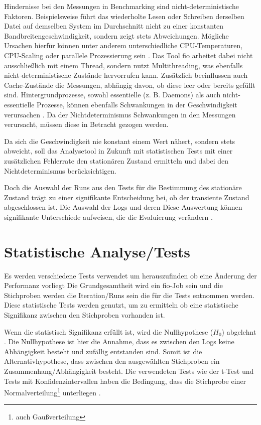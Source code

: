 Hindernisse bei den Messungen in Benchmarking sind nicht-deterministische Faktoren.
Beispielsweise führt das wiederholte Lesen oder Schreiben derselben Datei auf demselben System im Durchschnitt nicht zu einer konstanten Bandbreitengeschwindigkeit, 
sondern zeigt stets Abweichungen. 
Mögliche Ursachen hierfür können unter anderem unterschiedliche CPU-Temperaturen, CPU-Scaling oder parallele Prozessierung sein \cite{statistically_rigorous}. 
Das Tool fio arbeitet dabei nicht ausschließlich mit einem Thread, sondern nutzt Multithreading, was ebenfalls nicht-deterministische Zustände hervorrufen kann. 
Zusätzlich beeinflussen auch Cache-Zustände die Messungen, abhängig davon, ob diese leer oder bereits gefüllt sind. Hintergrundprozesse, 
sowohl essentielle (z. B. Daemons) als auch nicht-essentielle Prozesse, 
können ebenfalls Schwankungen in der Geschwindigkeit verursachen \cite{nine-year-of-bench}.
Da der Nichtdeterminismus Schwankungen in den Messungen verursacht, müssen diese in Betracht gezogen werden.

Da sich die Geschwindigkeit nie konstant einem Wert nähert, sondern stets
abweicht, soll das Analysetool in Zukunft mit statistischen Tests mit einer zusätzlichen Fehlerrate den stationären
Zustand ermitteln und dabei den Nichtdeterminismus berücksichtigen.

Doch die Auswahl der Runs aus den Tests für die Bestimmung des stationäre Zustand trägt zu einer signifikante Entscheidung bei,
 ob der transiente Zustand abgeschlossen ist.
Die Auswahl der Logs und deren Diese Auswertung können signifikante Unterschiede aufweisen, die die Evaluierung
verändern \cite{when_stop_tests}.



\section{Statistische Analyse/Tests}
Es werden verschiedene Tests verwendet um herauszufinden ob eine Änderung der Performanz vorliegt \cite{statistically_rigorous}
Die Grundgesamtheit wird ein fio-Job sein und die Stichproben werden die Iteration/Runs sein die für die Tests entnommen werden.
Diese statistische Tests werden genutzt, um zu ermitteln ob eine statistische Signifikanz zwischen den Stichproben vorhanden ist.

Wenn die statistisch Signifikanz erfüllt ist, wird die Nullhypothese ($H_0$) abgelehnt \cite{inferenzstatistik}.
Die Nullhypothese ist hier die Annahme, dass es zwischen den Logs keine Abhängigkeit besteht und zufällig entstanden sind.
Somit ist die Alternativhypothese, dass zwischen den ausgewählten Stichproben ein Zusammenhang/Abhängigkeit besteht.
Die verwendeten Tests wie der t-Test und Tests mit Konfidenzintervallen haben die Bedingung, 
dass die Stichprobe einer Normalverteilung\footnote{auch Gaußverteilung} unterliegen \cite{inferenzstatistik}. 

